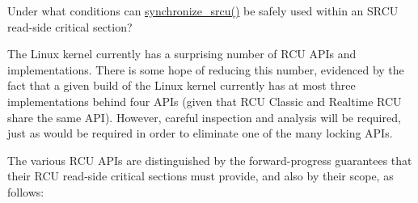 \QuickQuiz{}
	Under what conditions can \url{synchronize_srcu()} be safely
	used within an SRCU read-side critical section?
 \QuickQuizEnd

The Linux kernel currently has a surprising number of RCU APIs and
implementations.
There is some hope of reducing this number, evidenced by the fact
that a given build of the Linux kernel currently has at most
three implementations behind four APIs (given that RCU Classic
and Realtime RCU share the same API).
However, careful inspection and analysis will be required, just as
would be required in order to eliminate one of the many locking APIs.

The various RCU APIs are distinguished by the forward-progress
guarantees that their RCU read-side critical sections must provide,
and also by their scope, as follows:

